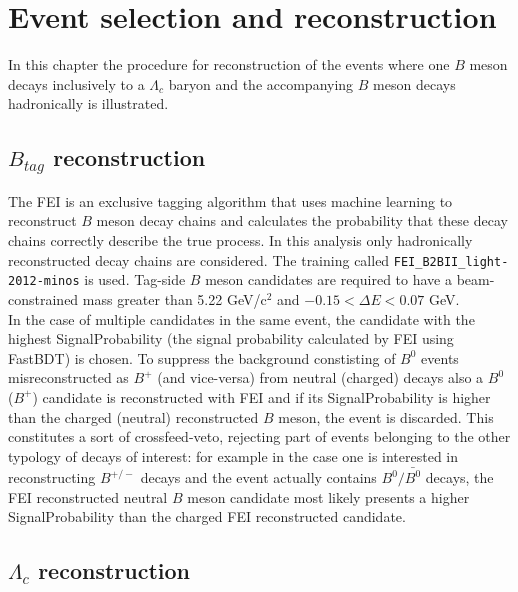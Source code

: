 \chapter{Event selection and reconstruction}

In this chapter the procedure for reconstruction of the events where one $B$ meson decays inclusively
to a $\Lambda_c$ baryon and the accompanying $B$ meson decays hadronically is illustrated.

\section{$B_{tag}$ reconstruction}

The FEI is an exclusive tagging algorithm that uses machine learning to reconstruct
$B$ meson decay chains and calculates the probability that these decay chains correctly
describe the true process. In this analysis only hadronically reconstructed decay chains are
considered. The training called \texttt{FEI\_}\texttt{B2BII\_}\texttt{light-2012-minos} is used. Tag-side $B$ meson candidates are required to have a beam-constrained mass greater than 5.22 GeV/c$^2$ and $- 0.15 < \Delta E < 0.07 $   GeV. \\
In the case of multiple candidates in the same event, the candidate with the highest SignalProbability (the signal probability calculated by FEI using FastBDT) is chosen. To suppress the background constisting of $B^0$ events misreconstructed as $B^+$ (and vice-versa) from neutral (charged) decays also a $B^0$ ($B^+$) candidate is reconstructed with FEI and if its SignalProbability is higher than the charged (neutral) reconstructed $B$ meson, the event is discarded. This constitutes a sort of crossfeed-veto, rejecting part of events belonging to the other typology of decays of interest: for example in the case one is interested in reconstructing $B^{+/-}$ decays and the event actually contains $B^0/\bar{B^0}$ decays, the FEI reconstructed neutral $B$ meson candidate most likely presents a higher SignalProbability than the charged FEI reconstructed candidate.

\section{$\Lambda_c$ reconstruction}

